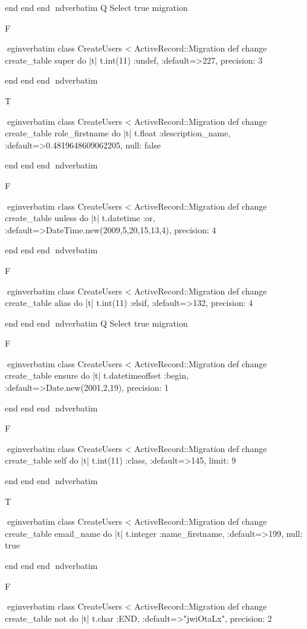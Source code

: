     end 
  end 
end
nd{verbatim}
Q
 Select true migration

F

egin{verbatim}
 class CreateUsers < ActiveRecord::Migration 
  def change 
    create_table super do |t| 
      t.int(11) :undef, :default=>227, precision: 3
    
    end 
  end 
end
nd{verbatim}

T

egin{verbatim}
 class CreateUsers < ActiveRecord::Migration 
  def change 
    create_table role_firstname do |t| 
      t.float :description_name, :default=>0.4819648609062205, null: false
    
    end 
  end 
end
nd{verbatim}

F

egin{verbatim}
 class CreateUsers < ActiveRecord::Migration 
  def change 
    create_table unless do |t| 
      t.datetime :or, :default=>DateTime.new(2009,5,20,15,13,4), precision: 4
    
    end 
  end 
end
nd{verbatim}

F

egin{verbatim}
 class CreateUsers < ActiveRecord::Migration 
  def change 
    create_table alias do |t| 
      t.int(11) :elsif, :default=>132, precision: 4
    
    end 
  end 
end
nd{verbatim}
Q
 Select true migration

F

egin{verbatim}
 class CreateUsers < ActiveRecord::Migration 
  def change 
    create_table ensure do |t| 
      t.datetimeoffset :begin, :default=>Date.new(2001,2,19), precision: 1
    
    end 
  end 
end
nd{verbatim}

F

egin{verbatim}
 class CreateUsers < ActiveRecord::Migration 
  def change 
    create_table self do |t| 
      t.int(11) :class, :default=>145, limit: 9
    
    end 
  end 
end
nd{verbatim}

T

egin{verbatim}
 class CreateUsers < ActiveRecord::Migration 
  def change 
    create_table email_name do |t| 
      t.integer :name_firstname, :default=>199, null: true
    
    end 
  end 
end
nd{verbatim}

F

egin{verbatim}
 class CreateUsers < ActiveRecord::Migration 
  def change 
    create_table not do |t| 
      t.char :END, :default=>"jwiOtaLx", precision: 2
    
